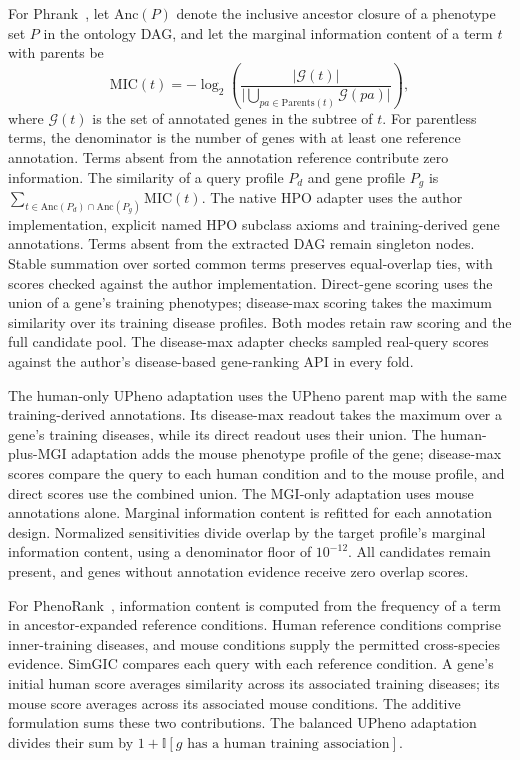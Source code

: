 \documentclass{article}
\begin{document}
For Phrank~\cite{jagadeesh2019phrank}, let $\mathrm{Anc}(P)$ denote the inclusive
ancestor closure of a phenotype set $P$ in the ontology DAG, and let the marginal
information content of a term $t$ with parents be
\begin{equation}
  \mathrm{MIC}(t) = -\log_2\!\left(\frac{|\mathcal{G}(t)|}{\bigl|\bigcup_{pa \in \mathrm{Parents}(t)} \mathcal{G}(pa)\bigr|}\right),
\end{equation}
where $\mathcal{G}(t)$ is the set of annotated genes in the subtree of $t$.
For parentless terms, the denominator is the number of genes with at least
one reference annotation. Terms absent from the annotation reference contribute
zero information.
The similarity of a query profile $P_d$ and gene profile $P_g$ is
$\sum_{t\in\mathrm{Anc}(P_d)\cap\mathrm{Anc}(P_g)}\mathrm{MIC}(t)$.
The native HPO adapter uses the author implementation, explicit named HPO
subclass axioms and training-derived gene annotations. Terms absent from the
extracted DAG remain singleton nodes. Stable summation over sorted common
terms preserves equal-overlap ties, with scores checked against the author
implementation. Direct-gene scoring uses the union of a gene's training
phenotypes; disease-max scoring takes the maximum similarity over its training
disease profiles. Both modes retain raw scoring and the full candidate pool.
The disease-max adapter checks sampled real-query scores against the author's
disease-based gene-ranking API in every fold.

The human-only UPheno adaptation uses the UPheno parent map with the same
training-derived annotations. Its disease-max readout takes the maximum over
a gene's training diseases, while its direct readout uses their union. The
human-plus-MGI adaptation adds the mouse phenotype profile of the gene;
disease-max scores compare the query to each human condition and to the mouse
profile, and direct scores use the combined union. The MGI-only adaptation
uses mouse annotations alone. Marginal information content is refitted for
each annotation design. Normalized sensitivities divide overlap by the target
profile's marginal information content, using a denominator floor of
$10^{-12}$. All candidates remain present, and genes without annotation evidence
receive zero overlap scores.

For PhenoRank~\cite{cornish2018phenorank}, information content is computed
from the frequency of a term in ancestor-expanded reference conditions.
Human reference conditions comprise inner-training diseases, and mouse
conditions supply the permitted cross-species evidence. SimGIC compares each
query with each reference condition. A gene's initial human score averages
similarity across its associated training diseases; its mouse score averages
across its associated mouse conditions. The additive formulation sums these
two contributions. The balanced UPheno adaptation divides their sum by
$1+\mathbb{I}[g\text{ has a human training association}]$.
\end{document}
